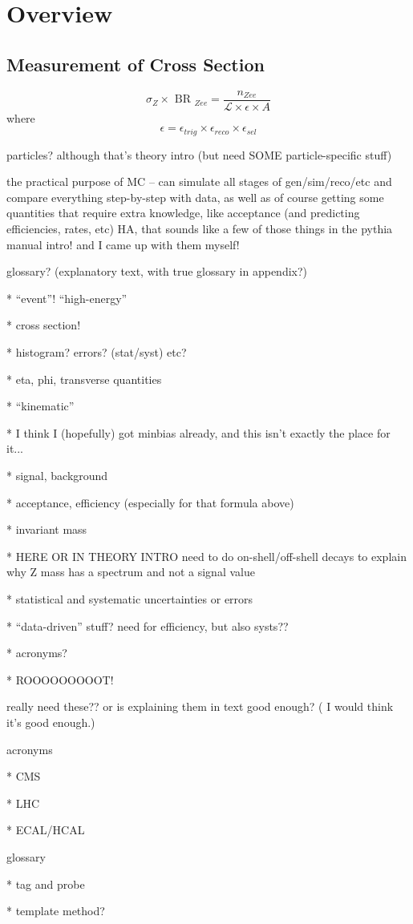 \chapter{Overview}
\label{over}
\section{Measurement of Cross Section}
\label{over:xsec}
\[
\sigma_{ Z } \times \textrm{ BR }_{ Zee } = \frac{ n_{ Zee } }{  \mathcal{ L } \times \epsilon \times A}
\]
where
\[
\epsilon = \epsilon_{ trig } \times \epsilon_{ reco } \times \epsilon_{ sel }
\]

particles?  although that's theory intro (but need SOME particle-specific stuff) 

the practical purpose of MC -- can simulate all stages of gen/sim/reco/etc and compare 
everything step-by-step with data, as well as of course getting some quantities 
that require extra knowledge, like acceptance (and predicting efficiencies, rates, etc)
HA, that sounds like a few of those things in the pythia manual intro!  and I came 
up with them myself!  

glossary? (explanatory text, with true glossary in appendix?)  

   * ``event''!  ``high-energy''

   * cross section!

   * histogram?  errors? (stat/syst) etc?

   * eta, phi, transverse quantities

   * ``kinematic''

   * I think I (hopefully) got minbias already, and this isn't exactly the place for it... 

   * signal, background

   * acceptance, efficiency (especially for that formula above)

   * invariant mass

   * HERE OR IN THEORY INTRO need to do on-shell/off-shell decays 
to explain why Z mass has a spectrum and not a signal value

   * statistical and systematic uncertainties or errors

   * ``data-driven'' stuff?  need for efficiency, but also systs??

   * acronyms?  

   * ROOOOOOOOOT!




really need these??  or is explaining them in text good enough?  (
I would think it's good enough.)

acronyms

   * CMS

   * LHC

   * ECAL/HCAL



glossary

   * tag and probe

   * template method?